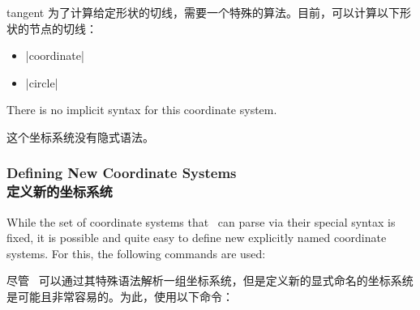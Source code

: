 \begin{coordinatesystem}{tangent}
    为了计算给定形状的切线，需要一个特殊的算法。目前，可以计算以下形状的节点的切线：
    \begin{itemize}
        \item |coordinate|
        \item |circle|
    \end{itemize}
\begin{codeexample}[preamble={\usetikzlibrary{calc}}]
\end{codeexample}

    There is no implicit syntax for this coordinate system.

    这个坐标系统没有隐式语法。

\end{coordinatesystem}


\subsubsection{Defining New Coordinate Systems\\定义新的坐标系统}

While the set of coordinate systems that \tikzname\ can parse via their special
syntax is fixed, it is possible and quite easy to define new explicitly named
coordinate systems. For this, the following commands are used:

尽管 \tikzname\ 可以通过其特殊语法解析一组坐标系统，但是定义新的显式命名的坐标系统是可能且非常容易的。为此，使用以下命令：

